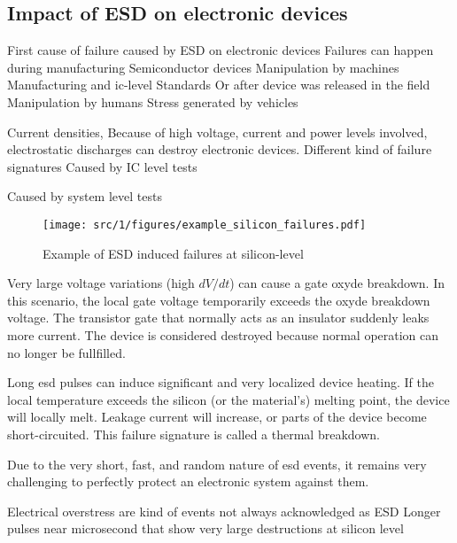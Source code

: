 \subsection{Impact of ESD on electronic devices}

First cause of failure caused by ESD on electronic devices
Failures can happen during manufacturing
Semiconductor devices
Manipulation by machines
Manufacturing and ic-level Standards
Or after device was released in the field
Manipulation by humans
Stress generated by vehicles


Current densities,
Because of high voltage, current and power levels involved, electrostatic discharges can destroy electronic devices.
Different kind of failure signatures
Caused by IC level tests

Caused by system level tests

\begin{figure}[!h]
  \centering
  \texttt{[image: src/1/figures/example\_silicon\_failures.pdf]}
  \caption{Example of ESD induced failures at silicon-level}
  \label{fig:silicon-level-failures}
\end{figure}


Very large voltage variations (high $dV/dt$) can cause a gate oxyde breakdown.
In this scenario, the local gate voltage temporarily exceeds the oxyde breakdown voltage.
The transistor gate that normally acts as an insulator suddenly leaks more current.
The device is considered destroyed because normal operation can no longer be fullfilled.

Long \gls{esd} pulses can induce significant and very localized device heating.
If the local temperature exceeds the silicon (or the material's) melting point, the device will locally melt.
Leakage current will increase, or parts of the device become short-circuited.
This failure signature is called a thermal breakdown.

Due to the very short, fast, and random nature of \gls{esd} events, it remains very challenging to perfectly protect an electronic system against them.

Electrical overstress are kind of events not always acknowledged as ESD
Longer pulses near microsecond that show very large destructions at silicon level

